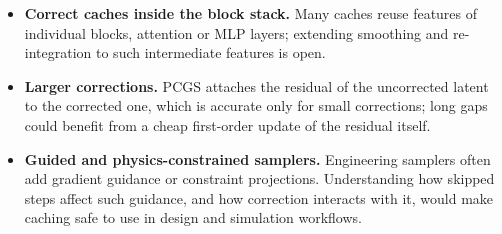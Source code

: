 \begin{itemize}
  \item \textbf{Correct caches inside the block stack.} Many caches reuse features of individual blocks, attention or MLP layers; extending smoothing and re-integration to such intermediate features is open.
  \item \textbf{Larger corrections.} PCGS attaches the residual of the uncorrected latent to the corrected one, which is accurate only for small corrections; long gaps could benefit from a cheap first-order update of the residual itself.
  \item \textbf{Guided and physics-constrained samplers.} Engineering samplers often add gradient guidance or constraint projections. Understanding how skipped steps affect such guidance, and how correction interacts with it, would make caching safe to use in design and simulation workflows.
\end{itemize}
